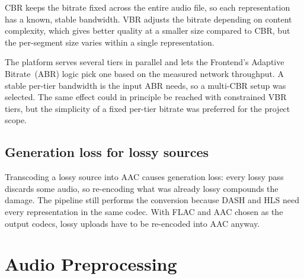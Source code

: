 \documentclass[a4paper,11pt]{article}
\begin{document}
CBR keeps the bitrate fixed across the entire audio file, so each
representation has a known, stable bandwidth. VBR adjusts the bitrate
depending on content complexity, which gives better quality at a
smaller size compared to CBR, but the per-segment size varies within a
single representation.~\parencite{cbrvbrcomp}

The platform serves several tiers in parallel and lets the Frontend's
Adaptive Bitrate~(ABR) logic pick one based on the measured network
throughput. A stable per-tier bandwidth is the input ABR needs, so a
multi-CBR setup was selected. The same effect could in principle be
reached with constrained VBR tiers, but the simplicity of a fixed
per-tier bitrate was preferred for the project scope.

\subsection{Generation loss for lossy sources}
Transcoding a lossy source into AAC causes generation loss: every
lossy pass discards some audio, so re-encoding what was already lossy
compounds the damage. The pipeline still performs the conversion
because DASH and HLS need every representation in the same codec. With
FLAC and AAC chosen as the output codecs, lossy uploads have to be
re-encoded into AAC anyway.

\section{Audio Preprocessing}
\end{document}
